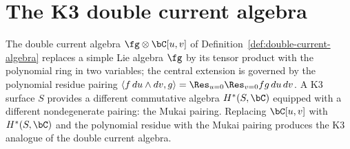 
\section{The K3 double current algebra}
\label{sec:k3-double-current-algebra}

The double current algebra $\fg \otimes \bC[u,v]$ of
Definition~\ref{def:double-current-algebra} replaces a simple Lie
algebra $\fg$ by its tensor product with the polynomial ring in two
variables; the central extension is governed by the polynomial
residue pairing $\langle f\,du \wedge dv, g \rangle = \Res_{u=0} \Res_{v=0} fg\,du\,dv$.
A K3 surface $S$ provides a different commutative algebra $H^*(S,\bC)$
equipped with a different nondegenerate pairing: the Mukai pairing.
Replacing $\bC[u,v]$ with $H^*(S,\bC)$ and the polynomial residue
with the Mukai pairing produces the K3 analogue of the double current
algebra.

